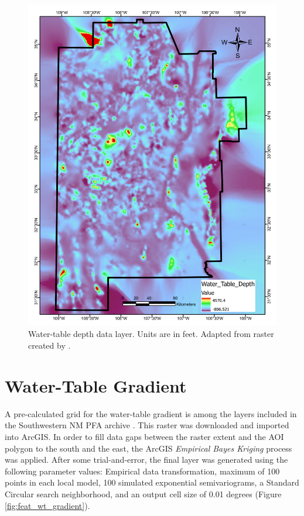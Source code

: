 \begin{figure}[H]
\centering
\includegraphics[width=0.75\linewidth]{templates/images/Figure-WTDepth.pdf}
\caption[Water-table depth data layer]{Water-table depth data layer. Units are in feet. Adapted from raster created by \protect\citep{bielicki_hydrogeolgic_2015}.}
\label{fig:feat_wtdepth}
\end{figure}

\section{Water-Table Gradient}\label{app:dl_wt_gradient}
A pre-calculated grid for the water-table gradient is among the layers included in the Southwestern NM PFA archive \citep{kelley_geothermal_2015}. This raster was downloaded and imported into ArcGIS. In order to fill data gaps between the raster extent and the AOI polygon to the south and the east, the ArcGIS \textit{Empirical Bayes Kriging} process was applied. After some trial-and-error, the final layer was generated using the following parameter values: Empirical data transformation, maximum of 100 points in each local model, 100 simulated exponential semivariograms, a Standard Circular search neighborhood, and an output cell size of 0.01 degrees (Figure \ref{fig:feat_wt_gradient}).

